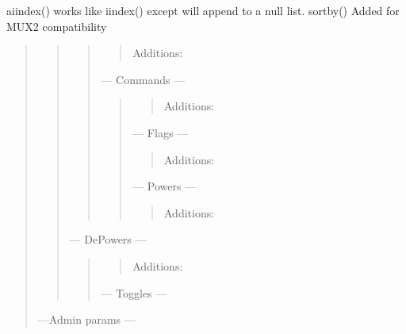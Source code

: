 \documentclass[letterpaper,10pt,english]{sphinxmanual}
\begin{document}
\sphinxAtStartPar
aiindex() \sphinxhyphen{} works like iindex() except will append to a null list.
sortby() \sphinxhyphen{} Added for MUX2 compatibility
\begin{quote}
\begin{quote}
\begin{quote}
\begin{quote}

\sphinxAtStartPar
Additions:
\end{quote}

\sphinxAtStartPar
— Commands —
\begin{quote}
\begin{quote}

\sphinxAtStartPar
Additions:
\end{quote}

\sphinxAtStartPar
— Flags —
\begin{quote}

\sphinxAtStartPar
Additions:
\end{quote}

\sphinxAtStartPar
— Powers —
\begin{quote}

\sphinxAtStartPar
Additions:
\end{quote}
\end{quote}
\end{quote}

\sphinxAtStartPar
— De\sphinxhyphen{}Powers —
\begin{quote}
\begin{quote}

\sphinxAtStartPar
Additions:
\end{quote}

\sphinxAtStartPar
— Toggles —
\end{quote}
\end{quote}

\begin{flushright}
---Admin params —
\end{flushright}
\end{quote}
\end{document}
